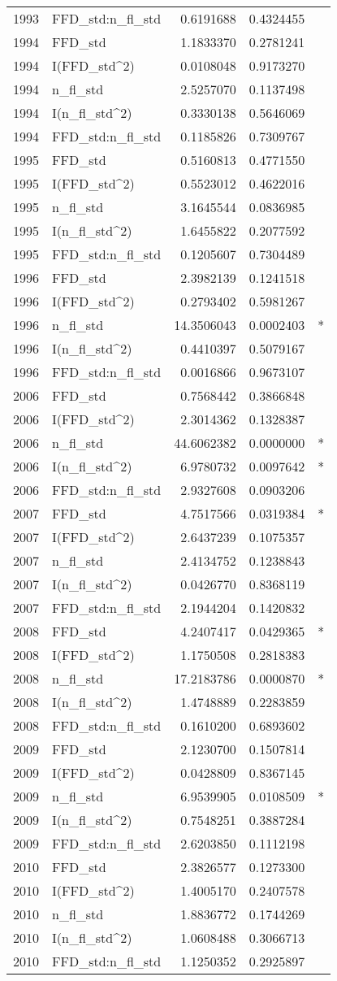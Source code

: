 \documentclass[]{article}
\begin{document}
\begin{longtable}[]{@{}llrrl@{}}
1993 & FFD\_std:n\_fl\_std & 0.6191688 & 0.4324455 &\tabularnewline
1994 & FFD\_std & 1.1833370 & 0.2781241 &\tabularnewline
1994 & I(FFD\_std\^{}2) & 0.0108048 & 0.9173270 &\tabularnewline
1994 & n\_fl\_std & 2.5257070 & 0.1137498 &\tabularnewline
1994 & I(n\_fl\_std\^{}2) & 0.3330138 & 0.5646069 &\tabularnewline
1994 & FFD\_std:n\_fl\_std & 0.1185826 & 0.7309767 &\tabularnewline
1995 & FFD\_std & 0.5160813 & 0.4771550 &\tabularnewline
1995 & I(FFD\_std\^{}2) & 0.5523012 & 0.4622016 &\tabularnewline
1995 & n\_fl\_std & 3.1645544 & 0.0836985 &\tabularnewline
1995 & I(n\_fl\_std\^{}2) & 1.6455822 & 0.2077592 &\tabularnewline
1995 & FFD\_std:n\_fl\_std & 0.1205607 & 0.7304489 &\tabularnewline
1996 & FFD\_std & 2.3982139 & 0.1241518 &\tabularnewline
1996 & I(FFD\_std\^{}2) & 0.2793402 & 0.5981267 &\tabularnewline
1996 & n\_fl\_std & 14.3506043 & 0.0002403 & *\tabularnewline
1996 & I(n\_fl\_std\^{}2) & 0.4410397 & 0.5079167 &\tabularnewline
1996 & FFD\_std:n\_fl\_std & 0.0016866 & 0.9673107 &\tabularnewline
2006 & FFD\_std & 0.7568442 & 0.3866848 &\tabularnewline
2006 & I(FFD\_std\^{}2) & 2.3014362 & 0.1328387 &\tabularnewline
2006 & n\_fl\_std & 44.6062382 & 0.0000000 & *\tabularnewline
2006 & I(n\_fl\_std\^{}2) & 6.9780732 & 0.0097642 & *\tabularnewline
2006 & FFD\_std:n\_fl\_std & 2.9327608 & 0.0903206 &\tabularnewline
2007 & FFD\_std & 4.7517566 & 0.0319384 & *\tabularnewline
2007 & I(FFD\_std\^{}2) & 2.6437239 & 0.1075357 &\tabularnewline
2007 & n\_fl\_std & 2.4134752 & 0.1238843 &\tabularnewline
2007 & I(n\_fl\_std\^{}2) & 0.0426770 & 0.8368119 &\tabularnewline
2007 & FFD\_std:n\_fl\_std & 2.1944204 & 0.1420832 &\tabularnewline
2008 & FFD\_std & 4.2407417 & 0.0429365 & *\tabularnewline
2008 & I(FFD\_std\^{}2) & 1.1750508 & 0.2818383 &\tabularnewline
2008 & n\_fl\_std & 17.2183786 & 0.0000870 & *\tabularnewline
2008 & I(n\_fl\_std\^{}2) & 1.4748889 & 0.2283859 &\tabularnewline
2008 & FFD\_std:n\_fl\_std & 0.1610200 & 0.6893602 &\tabularnewline
2009 & FFD\_std & 2.1230700 & 0.1507814 &\tabularnewline
2009 & I(FFD\_std\^{}2) & 0.0428809 & 0.8367145 &\tabularnewline
2009 & n\_fl\_std & 6.9539905 & 0.0108509 & *\tabularnewline
2009 & I(n\_fl\_std\^{}2) & 0.7548251 & 0.3887284 &\tabularnewline
2009 & FFD\_std:n\_fl\_std & 2.6203850 & 0.1112198 &\tabularnewline
2010 & FFD\_std & 2.3826577 & 0.1273300 &\tabularnewline
2010 & I(FFD\_std\^{}2) & 1.4005170 & 0.2407578 &\tabularnewline
2010 & n\_fl\_std & 1.8836772 & 0.1744269 &\tabularnewline
2010 & I(n\_fl\_std\^{}2) & 1.0608488 & 0.3066713 &\tabularnewline
2010 & FFD\_std:n\_fl\_std & 1.1250352 & 0.2925897 &\tabularnewline

\end{longtable}
\end{document}
